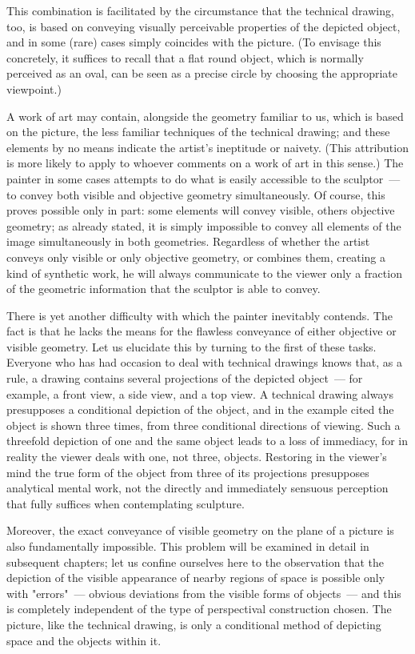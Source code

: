 This combination is facilitated by the circumstance that the technical drawing, too, is
based on conveying visually perceivable properties of the depicted object, and in some
(rare) cases simply coincides with the picture. (To envisage this concretely, it suffices to
recall that a flat round object, which is normally perceived as an oval, can be seen as a
precise circle by choosing the appropriate viewpoint.)

A work of art may contain, alongside the geometry familiar to us, which is based on the
picture, the less familiar techniques of the technical drawing; and these elements by no
means indicate the artist's ineptitude or naivety. (This attribution is more likely to apply
to whoever comments on a work of art in this sense.) The painter in some cases attempts
to do what is easily accessible to the sculptor~--- to convey both visible and objective
geometry simultaneously. Of course, this proves possible only in part: some elements will
convey visible, others objective geometry; as already stated, it is simply impossible to
convey all elements of the image simultaneously in both geometries. Regardless of
whether the artist conveys only visible or only objective geometry, or combines them,
creating a kind of synthetic work, he will always communicate to the viewer only a
fraction of the geometric information that the sculptor is able to convey.


There is yet another difficulty with which the painter inevitably contends. The fact is
that he lacks the means for the flawless conveyance of either objective or visible
geometry. Let us elucidate this by turning to the first of these tasks. Everyone who has
had occasion to deal with technical drawings knows that, as a rule, a drawing contains
several projections of the depicted object~--- for example, a front view, a side view, and
a top view. A technical drawing always presupposes a conditional depiction of the object,
and in the example cited the object is shown three times, from three conditional
directions of viewing. Such a threefold depiction of one and the same object leads to a
loss of immediacy, for in reality the viewer deals with one, not three, objects. Restoring
in the viewer's mind the true form of the object from three of its projections presupposes
analytical mental work, not the directly and immediately sensuous perception that fully
suffices when contemplating sculpture.

Moreover, the exact conveyance of visible geometry on the plane of a picture is also
fundamentally impossible. This problem will be examined in detail in subsequent
chapters; let us confine ourselves here to the observation that the depiction of the
visible appearance of nearby regions of space is possible only with "errors"~--- obvious
deviations from the visible forms of objects~--- and this is completely independent of the
type of perspectival construction chosen. The picture, like the technical drawing, is only
a conditional method of depicting space and the objects within it.

